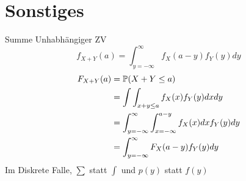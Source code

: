 \section*{Sonstiges}

\begin{mainbox}{Summe Unhabhängiger ZV}
    $$f_{X+Y}(a) = \int_{y=-\infty}^{\infty} f_X(a - y)f_Y(y) dy$$
    \begin{align*}
        F_{X+Y}(a) & = \mathbb{P}(X+Y \leq a) \\
        & = \int \int_{x + y \leq a} f_X (x) f_Y(y) dx dy \\
        & = \int_{y = - \infty}^\infty \int_{x = -\infty}^{a - y} f_X(x) dx f_Y(y) dy \\
        & = \int_{y=-\infty}^{\infty} F_X(a - y)f_Y(y) dy
    \end{align*}
    Im Diskrete Falle, $\sum$ statt $\int$ und $p(y)$ statt $f(y)$
\end{mainbox}
\vfill\null
\columnbreak